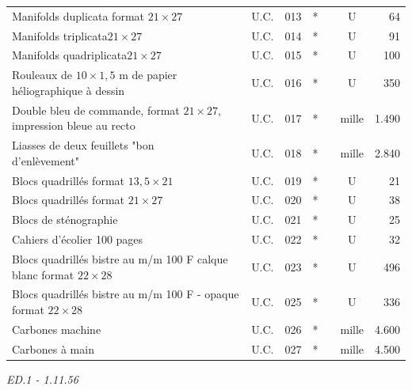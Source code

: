 {{\begin{tabular}{|l|c|r|c|c|c|r|}
Manifolds duplicata format $21\!\times\!27$ & U.C. & 013 & * &  & U & 64 \\
Manifolds triplicata\qquad $21\!\times\!27$ & U.C. & 014 & * &  & U & 91 \\
Manifolds quadriplicata\quad $21\!\times\!27$ & U.C. & 015 & * &  & U & 100 \\
\shortstack[l]{Rouleaux de $10\!\times\!1{,}5$ m de papier\\héliographique à dessin} & U.C. & 016 & * &  & U & 350 \\
\shortstack[l]{Double bleu de commande, format\\$21\!\times\!27$, impression bleue au recto} & U.C. & \unsure{.} 017 & * &  & mille & 1.490 \\
\shortstack[l]{Liasses de deux feuillets "bon\\d'enlèvement"} & U.C. & 018 & * &  & mille & 2.840 \\
Blocs quadrillés format $13{,}5\!\times\!21$ & U.C. & 019 & * &  & U & 21 \\
Blocs quadrillés format $21\!\times\!27$ & U.C. & 020 & * &  & U & 38 \\
Blocs de sténographie & U.C. & 021 & * &  & U & 25 \\
Cahiers d'écolier 100 pages & U.C. & 022 & * &  & U & 32 \\
\shortstack[l]{Blocs quadrillés bistre au m/m\\100 F calque blanc format $22\!\times\!28$} & U.C. & 023 & * &  & U & 496 \\
\shortstack[l]{Blocs quadrillés bistre au m/m\\100 F - opaque format $22\!\times\!28$} & U.C. & 025 & * &  & U & 336 \\
Carbones machine & U.C. & 026 & * &  & mille & 4.600 \\
Carbones à main & U.C. & 027 & * &  & mille & 4.500 \\
\end{tabular}}}
\hfill\textit{ED.1 - 1.11.56}
